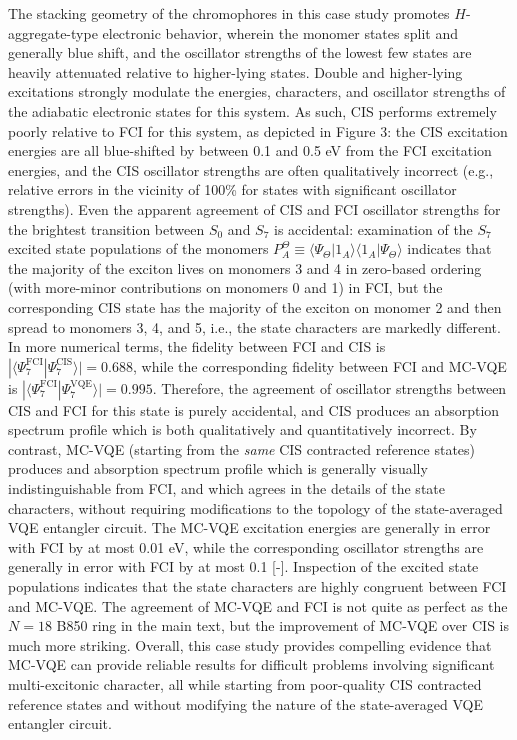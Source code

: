 The stacking geometry of the chromophores in this case study promotes
$H$-aggregate-type electronic behavior, wherein the monomer states split and
generally blue shift, and the oscillator strengths of the lowest few states are
heavily attenuated relative to higher-lying states. Double and higher-lying
excitations strongly modulate the energies, characters, and oscillator strengths
of the adiabatic electronic states for this system. As such, CIS performs
extremely poorly relative to FCI for this system, as depicted in Figure 3: the
CIS excitation energies are all blue-shifted by between 0.1 and 0.5 eV from the
FCI excitation energies, and the CIS oscillator strengths are often
qualitatively incorrect (e.g., relative errors in the vicinity of 100\% for
states with significant oscillator strengths). Even the apparent agreement of
CIS and FCI oscillator strengths for the brightest transition between $S_0$ and
$S_7$ is accidental: examination of the $S_7$ excited state populations of the
monomers $P_{A}^{\Theta} \equiv \langle \Psi_{\Theta} | 1_A \rangle \langle 1_A
| \Psi_{\Theta} \rangle$ indicates that the majority of the exciton lives on
monomers 3 and 4 in zero-based ordering (with more-minor contributions on
monomers 0 and 1) in FCI, but the corresponding CIS state has the majority of
the exciton on monomer 2 and then spread to monomers 3, 4, and 5, i.e., the
state characters are markedly different. In more numerical terms, the fidelity
between FCI and CIS is $| \langle \Psi_{7}^{\mathrm{FCI}} |
\Psi_{7}^{\mathrm{CIS}} \rangle | = 0.688$, while the corresponding fidelity
between FCI and MC-VQE is $| \langle \Psi_{7}^{\mathrm{FCI}} |
\Psi_{7}^{\mathrm{VQE}} \rangle | = 0.995$.  Therefore, the agreement of
oscillator strengths between CIS and FCI for this state is purely accidental,
and CIS produces an absorption spectrum profile which is both qualitatively and
quantitatively incorrect. By contrast, MC-VQE (starting from the \emph{same} CIS
contracted reference states) produces and absorption spectrum profile which is
generally visually indistinguishable from FCI, and which agrees in the details
of the state characters, without requiring modifications to the topology of the
state-averaged VQE entangler circuit. The MC-VQE excitation energies are
generally in error with FCI by at most 0.01 eV, while the corresponding
oscillator strengths are generally in error with FCI by at most 0.1 [-].
Inspection of the excited state populations indicates that the state characters
are highly congruent between FCI and MC-VQE. The agreement of MC-VQE and FCI is
not quite as perfect as the $N=18$ B850 ring in the main text, but the
improvement of MC-VQE over CIS is much more striking.  Overall, this case study
provides compelling evidence that MC-VQE can provide reliable results for
difficult problems involving significant multi-excitonic character, all while
starting from poor-quality CIS contracted reference states and without modifying
the nature of the state-averaged VQE entangler circuit.

